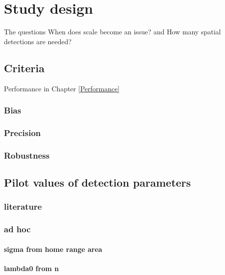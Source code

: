 \documentclass[
]{book}
\begin{document}
\chapter{Study design}\label{Studydesign}

The questions When does scale become an issue? and How many spatial detections are needed?

\section{Criteria}\label{criteria}

Performance in Chapter \ref{Performance}

\subsection{Bias}\label{bias}

\subsection{Precision}\label{precision}

\subsection{Robustness}\label{robustness-1}

\section{Pilot values of detection parameters}\label{pilot-values-of-detection-parameters}

\subsection{literature}\label{literature}

\subsection{ad hoc}\label{ad-hoc}

\subsubsection{sigma from home range area}\label{sigma-from-home-range-area}

\subsubsection{lambda0 from n}\label{lambda0-from-n}
\end{document}
